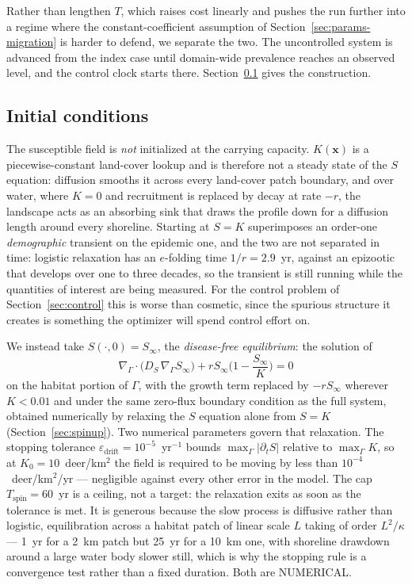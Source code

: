 \documentclass[11pt]{article}
\newcommand{\tagNUM}{{\footnotesize\textsf{\textcolor{purple!70!black}{NUMERICAL}}}}
\newcommand{\Grad}{\nabla_\Gamma}
\newcommand{\Div}{\nabla_\Gamma\cdot}
\begin{document}
Rather than lengthen $T$, which raises cost linearly and pushes the run further into a regime where the constant-coefficient assumption of Section~\ref{sec:params-migration} is harder to defend, we separate the two. The uncontrolled system is advanced from the index case until domain-wide prevalence reaches an observed level, and the control clock starts there. Section~\ref{sec:params-ic} gives the construction.

\subsection{Initial conditions}
\label{sec:params-ic}

The susceptible field is \emph{not} initialized at the carrying capacity. $K(\mathbf{x})$ is a piecewise-constant land-cover lookup and is therefore not a steady state of the $S$ equation: diffusion smooths it across every land-cover patch boundary, and over water, where $K=0$ and recruitment is replaced by decay at rate $-r$, the landscape acts as an absorbing sink that draws the profile down for a diffusion length around every shoreline. Starting at $S=K$ superimposes an order-one \emph{demographic} transient on the epidemic one, and the two are not separated in time: logistic relaxation has an $e$-folding time $1/r = 2.9$~yr, against an epizootic that develops over one to three decades, so the transient is still running while the quantities of interest are being measured. For the control problem of Section~\ref{sec:control} this is worse than cosmetic, since the spurious structure it creates is something the optimizer will spend control effort on.

We instead take $S(\cdot,0)=S_\infty$, the \emph{disease-free equilibrium}: the solution of
\begin{equation}
\Div\big(D_S\,\Grad S_\infty\big) + rS_\infty\Big(1-\frac{S_\infty}{K}\Big) = 0
\label{eq:disease-free}
\end{equation}
on the habitat portion of $\Gamma$, with the growth term replaced by $-rS_\infty$ wherever $K<0.01$ and under the same zero-flux boundary condition as the full system, obtained numerically by relaxing the $S$ equation alone from $S=K$ (Section~\ref{sec:spinup}). Two numerical parameters govern that relaxation. The stopping tolerance $\varepsilon_{\text{drift}} = 10^{-5}$~yr$^{-1}$ bounds $\max_\Gamma|\partial_t S|$ relative to $\max_\Gamma K$, so at $K_0 = 10$~deer/km$^2$ the field is required to be moving by less than $10^{-4}$~deer/km$^2$/yr --- negligible against every other error in the model. The cap $T_{\text{spin}} = 60$~yr is a ceiling, not a target: the relaxation exits as soon as the tolerance is met. It is generous because the slow process is diffusive rather than logistic, equilibration across a habitat patch of linear scale $L$ taking of order $L^2/\kappa$ --- 1~yr for a 2~km patch but 25~yr for a 10~km one, with shoreline drawdown around a large water body slower still, which is why the stopping rule is a convergence test rather than a fixed duration. Both are \tagNUM{}.
\end{document}
